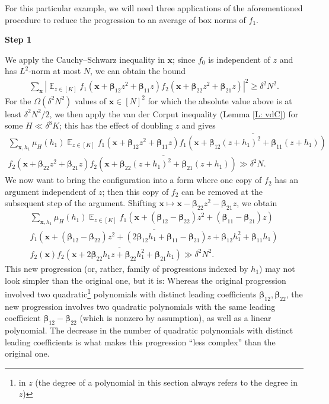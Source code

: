 \documentclass[11pt]{amsart}
\theoremstyle{definition}
\DeclareMathOperator*{\E}{\mathbb{E}}
\newcommand{\bx}{{\mathbf{x}}}
\newcommand{\bbeta}{{\boldsymbol{\beta}}}
\newcommand{\abs}[1]{\mathopen{}\left| #1\mathclose{}\right|}
\begin{document}
For this particular example, we will need three applications of the aforementioned procedure to reduce the progression to an average of box norms of $f_1$.

\smallskip
\textbf{Step 1}
\smallskip

We apply the Cauchy--Schwarz inequality in $\bx$; since $f_0$ is independent of $z$ and has $L^2$-norm at most $N$, we can obtain the bound
\begin{align*}
    \sum_{\bx}\abs{\E_{z\in[K]}f_1(\bx+ \bbeta_{12}z^2 + \bbeta_{11}z)f_2(\bx + \bbeta_{22}z^2 + \bbeta_{21}z)}^2\geq \delta^2 N^2.
\end{align*}
For the $\Omega(\delta^2 N^2)$ values of $\bx\in[N]^2$ for which the absolute value above is at least $\delta^2 N^2/2$, we then apply the van der Corput inequality (Lemma \ref{L: vdC}) for some $H\ll \delta^8 K$; this has the effect of doubling $z$ and gives
\begin{multline*}
    \sum_{\bx, h_1}\mu_H(h_1)\E_{z\in[K]}f_1(\bx + \bbeta_{12}z^2 + \bbeta_{11}z)\overline{f_1(\bx + \bbeta_{12}(z+h_1)^2 + \bbeta_{11}(z+h_1))}\\
    f_2(\bx + \bbeta_{22}z^2 + \bbeta_{21}z)\overline{f_2(\bx + \bbeta_{22}(z+h_1)^2 + \bbeta_{21}(z+h_1))}\gg \delta^2 N.
\end{multline*}
We now want to bring the configuration into a form where one copy of $f_2$ has an argument independent of $z$; then this copy of $f_2$ can be removed at the subsequent step of the argument. Shifting $\bx \mapsto \bx - \bbeta_{22}z^2 - \bbeta_{21}z$, we obtain
\begin{multline*}
    \sum_{\bx, h_1}\mu_H(h_1)\E_{z\in[K]}f_1(\bx + (\bbeta_{12}-\bbeta_{22})z^2 + (\bbeta_{11}-\bbeta_{21})z)\\
    \overline{f_1(\bx + (\bbeta_{12}-\bbeta_{22})z^2 + (2\bbeta_{12}h_1+\bbeta_{11}-\bbeta_{21} )z + \bbeta_{12}h_1^2 + \bbeta_{11}h_1)}\\
    f_2(\bx)\overline{f_2(\bx+2\bbeta_{22}h_1z + \bbeta_{22} h_1^2 + \bbeta_{21}h_1)}\gg\delta^2 N^2. 
\end{multline*}
This new progression (or, rather, family of progressions indexed by $h_1$) may not look simpler than the original one, but it is: Whereas the original progression involved two quadratic\footnote{in $z$ (the degree of a polynomial in this section always refers to the degree in $z$)} polynomials with distinct leading coefficients $\bbeta_{12}, \bbeta_{22}$, the new progression  involves two quadratic polynomials with the same leading coefficient $\bbeta_{12}-\bbeta_{22}$ (which is nonzero by assumption), as well as a linear polynomial. The decrease in the number of quadratic polynomials with distinct leading coefficients is what makes this progression ``less complex'' than the original one.
\end{document}

